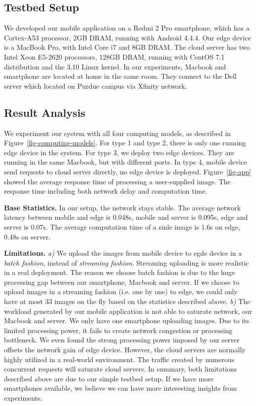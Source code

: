 \subsection{Testbed Setup}
We developed our mobile application on a Redmi 2 Pro smartphone, which has a Cortex-A53 processor, 2GB DRAM,
running with Android 4.4.4.
Our edge device is a MacBook Pro, with Intel Core i7 and 8GB DRAM. The cloud server has two Intel Xeon
E5-2620 processors, 128GB DRAM, running with CentOS 7.1 distribution and the 3.10 Linux kernel.
In our experiments, Macbook and smartphone are located at home in the same room. They connect to
the Dell server which located on Purdue campus via Xfinity network. 

\subsection{Result Analysis}
We experiment our system with all four computing models, as described in Figure~\ref{fig-computing-models}.
For type 1 and type 2, there is only one running edge device in the system. For type 3, we deploy two
edge devices. They are running in the same Macbook, but with different ports. In type 4, mobile device
send requests to cloud server directly, no edge device is deployed. Figure~\ref{fig-app} showed the
average response time of processing a user-supplied image. The response time including both network
delay and computation time.

\hfill\break
\noindent \textbf{Base Statistics.}
In our setup, the network stays stable. The average network latency between mobile
and edge is 0.048s, mobile and server is 0.095s, edge and server is 0.07s.
The average computation time of a sinle image is 1.6s on edge, 0.48s on server.

\hfill\break
\noindent \textbf{Limitations.}
{\it a)} We upload the images from mobile device to egde device in a {\em batch fashion}, instead of
{\em streaming fashion}. Streaming uploading is more realistic in a real deployment.
The reason we choose batch fashion is due to
the huge processing gap between our smartphone, Macbook and server. If we choose to upload
images in a streaming fashion (i.e. one by one) to edge, we could only have at most
33 images on the fly based on the statistics described above.
{\it b)} The workload generated by our mobile application is not able to saturate network, our Macbook and server.
We only have one smartphone uploading images. Due to its limited processing power, it fails to create
network congestion or processing bottleneck. We even found the strong processing power imposed by our
server offsets the network gain of edge device. However, the cloud servers are normally highly utilized
in a real-world environment. The traffic created by numerous concurrent requests will saturate cloud
servers. In summary, both limitations described above are due to our simple testbed setup. If we have
more smartphones available, we believe we can have more interesting insights from experiments.


